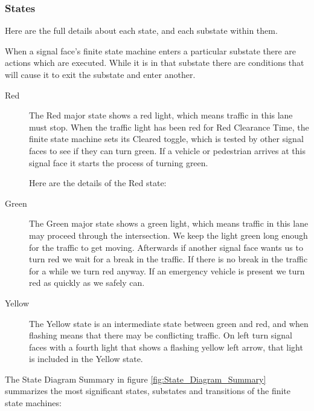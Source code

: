 \documentclass[letterpaper,twoside]{article}
\begin{document}
\subsubsection{States}

Here are the full details about each state, and each substate within them.

When a signal face's finite state machine enters a particular substate
there are actions which are executed.
While it is in that substate there are conditions
that will cause it to exit the substate and enter another.

\begin{description}

\item[Red]  
The Red major state shows a red light, which means traffic in this
lane must stop.  When the traffic light has been red for Red Clearance Time,
the finite state machine sets its Cleared toggle, which is tested by other
signal faces to see if they can turn green.  If a vehicle or
pedestrian arrives at this signal face it starts the process
of turning green.

Here are the details of the Red state:
      


\item[Green]
The Green major state shows a green light, which means traffic in this lane
may proceed through the intersection.  We keep the light green long enough
for the traffic to get moving.  Afterwards if another signal face wants us
to turn red we wait for a break in the traffic.  If there is no break in the
traffic for a while we turn red anyway.  If an emergency vehicle is present
we turn red as quickly as we safely can.



\item[Yellow]
The Yellow state is an intermediate state between green and red, and when
flashing means that there may be conflicting traffic.  On left turn signal
faces with a fourth light that shows a flashing yellow left arrow, that
light is included in the Yellow state.



\end{description}

The State Diagram Summary in figure \ref{fig:State_Diagram_Summary}
summarizes the most significant states, substates and
transitions of the finite state machines:
\end{document}
